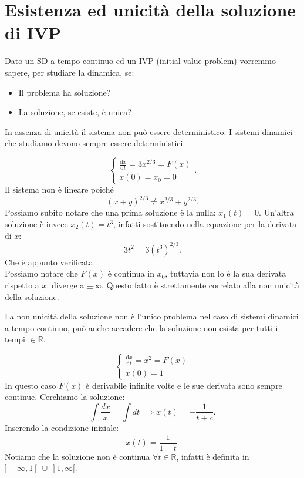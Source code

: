 \section{Esistenza ed unicità della soluzione di IVP}%
\label{sub:Esistenza ed unicità della soluzione di IVP}
Dato un SD a tempo continuo ed un IVP (initial value problem) vorremmo sapere, per studiare la dinamica, se:
\begin{itemize}
    \item Il problema ha soluzione?
    \item La soluzione, se esiste, è unica?
\end{itemize}
In assenza di unicità il sistema non può essere deterministico. I sistemi dinamici che studiamo devono sempre essere deterministici.
\begin{exmp}
    \[
        \begin{cases}
	    \frac{\text{d} x}{\text{d} t} = 3x^{2 /3} = F(x)\\
	    x(0)=x_0=0
        \end{cases}
    .\] 
    Il sistema non è lineare poiché
    \[
        \left(x+y\right)^{2 /3} \neq x^{2 /3}+y^{2 /3}
    .\] 
    Possiamo subito notare che una prima soluzione è la nulla: $x_1(t)=0$.
    Un'altra soluzione è invece $x_2(t)=t^3$, infatti sostituendo nella equazione per la derivata di $x$:
    \[
	3t^2 = 3(t^3)^{2 /3}
    .\] 
    Che è appunto verificata. \\
    Possiamo notare che $F(x)$ è continua in $x_0$, tuttavia non lo è la sua derivata rispetto a $x$: diverge a $\pm \infty$. Questo fatto è strettamente correlato alla non unicità della soluzione.
\end{exmp}
\noindent
La non unicità della soluzione non è l'unico problema nel caso di sistemi dinamici a tempo continuo, può anche accadere che la soluzione non esista per tutti i tempi $\in \mathbb{R}$.
\begin{exmp}
    \[
        \begin{cases}
	    \frac{\text{d} x}{\text{d} t} = x^2=F(x)\\
	    x(0)=1
        \end{cases}
    \] 
    In questo caso $F(x)$ è derivabile infinite volte e le sue derivata sono sempre continue. Cerchiamo la soluzione:
    \[
	\int\frac{dx}{x} = \int  dt \implies  x(t)=-\frac{1}{t+c}
    .\] 
    Inserendo la condizione iniziale:
    \[
	x(t) = \frac{1}{1-t}
    .\] 
    Notiamo che la soluzione non è continua $\forall t \in \mathbb{R}$, infatti è definita in $]-\infty, 1 [ \ \cup \ ]1, \infty[$.
\end{exmp}
